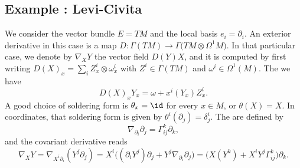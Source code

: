 \subsection{Example : Levi-Civita}

We consider the vector bundle $E=TM$ and the local basis $e_i=\partial_i$. An exterior derivative in this case is a map $D\colon \Gamma(TM)\to \Gamma\Big( TM\otimes\Omega^1M \Big)$. In that particular case, we denote by $\nabla_XY$ the vector field $D(Y)X$, and it is computed by first writing $D(X)_x=\sum_iZ_x^i\otimes\omega_x^i$ with $Z^i\in\Gamma(TM)$ and $\omega^i\in\Omega^1(M)$. The we have
\begin{equation}
D(X)_xY_x=\omega+x^i(Y_x)Z_x^i.
\end{equation}
A good choice of soldering form is $\theta_x=\id$ for every $x\in M$, or $\theta(X)=X$. In coordinates, that soldering form is given by $\theta^i(\partial_j)=\delta^i_j$. The  are defined by
\begin{equation}
\nabla_{\partial_i}\partial_j=\Gamma_{ij}^k\partial_k,
\end{equation}
and the covariant derivative reads
\begin{equation}		\label{EqCovDerGamChr}
\nabla_XY	= \nabla_{X^i\partial_i}(Y^j\partial_j)
		= X^i\Big( (\partial_iY^j)\partial_j+Y^j\nabla_{\partial_i}\partial_j \Big)
		= \Big( X(Y^k)+X^iY^j\Gamma_{ij}^k \Big) \partial_k.
\end{equation}

